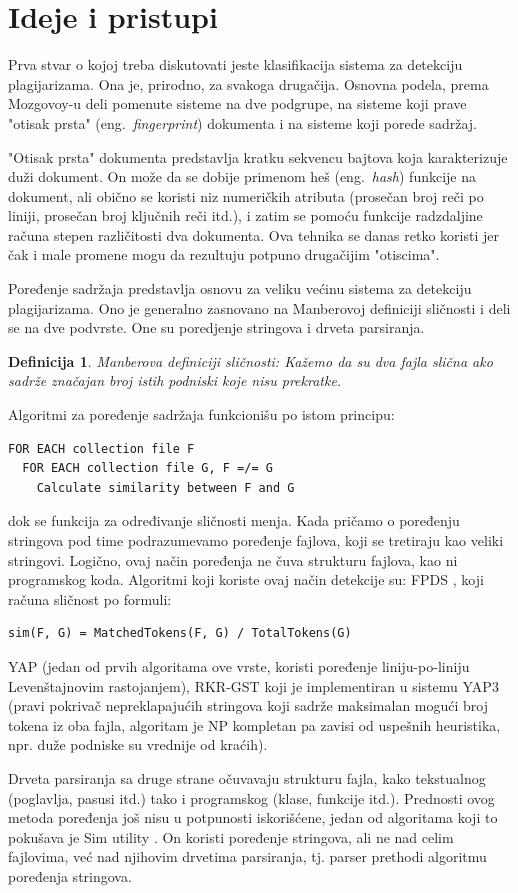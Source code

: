 \documentclass[a4paper]{article}
\newtheorem{definicija}{Definicija}[section]
\begin{document}
\section{Ideje i pristupi}
\label{sec:ideje i pristupi}

Prva stvar o kojoj treba diskutovati jeste klasifikacija sistema za detekciju plagijarizama. Ona je, prirodno, za svakoga drugačija. Osnovna podela, prema Mozgovoy-u \cite{mozgovoy} deli pomenute sisteme na dve podgrupe, na sisteme koji prave "otisak prsta" (eng.~{\em fingerprint}) dokumenta i na sisteme koji porede sadržaj.

\par "Otisak prsta" dokumenta predstavlja kratku sekvencu bajtova koja karakterizuje duži dokument. On može da se dobije primenom heš (eng.~{\em hash}) funkcije na dokument, ali obično se koristi niz numeričkih atributa (prosečan broj reči po liniji, prosečan broj ključnih reči itd.), i zatim se pomoću funkcije radzdaljine računa stepen različitosti dva dokumenta. Ova tehnika se danas retko koristi jer čak i male promene mogu da rezultuju potpuno drugačijim "otiscima".
\par Poređenje sadržaja predstavlja osnovu za veliku većinu sistema za detekciju plagijarizama. Ono je generalno zasnovano na Manberovoj definiciji sličnosti i deli se na dve podvrste. One su poredjenje stringova i drveta parsiranja.
\begin{definicija}
Manberova definiciji sličnosti: Kažemo da su dva fajla slična ako sadrže značajan broj istih podniski koje nisu prekratke.
\end{definicija}
Algoritmi za poređenje sadržaja funkcionišu po istom principu:
\begin{lstlisting}
FOR EACH collection file F
  FOR EACH collection file G, F =/= G
    Calculate similarity between F and G
\end{lstlisting}
dok se funkcija za određivanje sličnosti menja. Kada pričamo o poređenju stringova pod time podrazumevamo poređenje fajlova, koji se tretiraju kao veliki stringovi. Logično, ovaj način poređenja ne čuva strukturu fajlova, kao ni programskog koda. Algoritmi koji koriste ovaj način detekcije su: FPDS \cite{mozgovoyetal}, koji računa sličnost po formuli:
\begin{lstlisting}
sim(F, G) = MatchedTokens(F, G) / TotalTokens(G)
\end{lstlisting}
YAP \cite{wise} (jedan od prvih algoritama ove vrste, koristi poređenje liniju-po-liniju Levenštajnovim rastojanjem), RKR-GST koji je implementiran u sistemu YAP3 \cite{wise2} (pravi pokrivač nepreklapajućih stringova koji sadrže maksimalan mogući broj tokena iz oba fajla, algoritam je NP kompletan pa zavisi od uspešnih heuristika, npr. duže podniske su vrednije od kraćih).
\par Drveta parsiranja sa druge strane očuvavaju strukturu fajla, kako tekstualnog (poglavlja, pasusi itd.) tako i programskog (klase, funkcije itd.). Prednosti ovog metoda poređenja još nisu u potpunosti iskorišćene, jedan od algoritama koji to pokušava je Sim utility \cite{gitchelltran}. On koristi poređenje stringova, ali ne nad celim fajlovima, već nad njihovim drvetima parsiranja, tj. parser prethodi algoritmu poređenja stringova.
\end{document}
